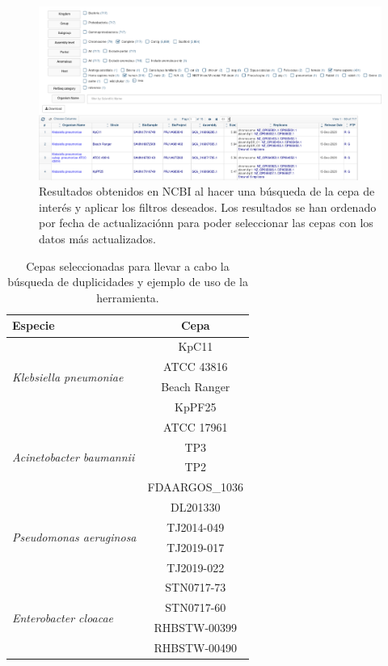 \begin{figure}
	\centering
	\captionsetup{width=\linewidth} 
	\includegraphics[width=\linewidth]{figs/busqueda_ncbi.png}
	\caption[Filtro de resultados de NCBI]{Resultados obtenidos en NCBI al hacer una búsqueda de la cepa de interés y aplicar los filtros deseados. Los resultados se han ordenado por fecha de actualizaciónn para poder seleccionar las cepas con los datos más actualizados.}
	\label{fig:busqueda_ncbi}
\end{figure}

\begin{table}
	\centering
	\captionsetup{width=0.5\linewidth}
	\begin{tabular}{ l || c }
		\hline
		Especie & Cepa\\
		\hline
		\hline
		\multirow{4}{*}{\textit{Klebsiella pneumoniae}} & KpC11 \\
		& ATCC 43816 \\
		& Beach Ranger \\
		& KpPF25 \\
		\hline
		\multirow{4}{*}{\textit{Acinetobacter baumannii}} & ATCC 17961 \\
		& TP3 \\
		& TP2 \\
		& FDAARGOS\_1036 \\
		\hline
		\multirow{4}{*}{\textit{Pseudomonas aeruginosa}} & DL201330 \\
		& TJ2014-049 \\
		& TJ2019-017 \\
		& TJ2019-022 \\
		\hline
		\multirow{4}{*}{\textit{Enterobacter cloacae}} & STN0717-73  \\
		& STN0717-60  \\
		& RHBSTW-00399  \\
		& RHBSTW-00490  \\
		\hline
	\end{tabular}
	\caption{Cepas seleccionadas para llevar a cabo la búsqueda de duplicidades y ejemplo de uso de la herramienta.}
	\label{table:cepas}
\end{table}


